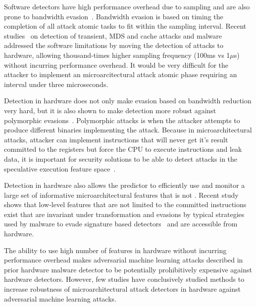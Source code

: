  
Software detectors have high performance overhead due to sampling and are also prone to bandwidth evasion~\cite{Gaudiot2020, PerSpectron}. Bandwidth evasion is based on timing the completion of all attack atomic 
tasks to fit within the sampling interval. Recent studies~\cite{PerSpectron, cyclone2019} on detection of transient, MDS and cache attacks and malware~\cite{Malware2015, ensembleRaid2015,kazdagli-16,RHMD2017} addressed the software limitations by moving the detection of
attacks to hardware, allowing thousand-times higher sampling frequency (100ms vs 1$\mu$s) without incurring performance overhead. It would be very difficult for the attacker to implement an microarcitectural attack atomic phase requiring an interval under three microseconds. 

Detection in hardware does not only make evasion based on bandwidth reduction very hard, but it is also shown to make detection more robust against polymorphic evasions~\cite{PerSpectron, cyclone2019, RHMD2017}. Polymorphic attacks is when the attacker attempts to produce different binaries implementing the attack. Because in microarchitectural attacks, attacker can implement instructions that will never get it’s result committed to the registers but force the CPU to execute instructions and leak data, it is important for security solutions 
to be able to detect attacks in the speculative execution feature 
space~\cite{wampler-19, PerSpectron}. 



Detection in hardware also allows the predictor to efficiently use and monitor a large set of informative microarchitectural features that is not . Recent study~\cite{PerSpectron} shows that low-level  features that are not limited to the committed instructions exist that are invariant under transformation and evasions by typical strategies
used by malware to evade signature based detectors~\cite{PaulKocher,paulKocherSpectreAttacks} and are accessible from hardware. 

The ability to use high number of features in hardware without incurring performance overhead makes adversarial machine learning attacks
described in prior hardware malware detector to be potentially prohibitively expensive against hardware detectors.
However, few studies have conclusively studied methods to increase robustness of  microarchitectural attack detectors in hardware against adversarial machine learning attacks. 


